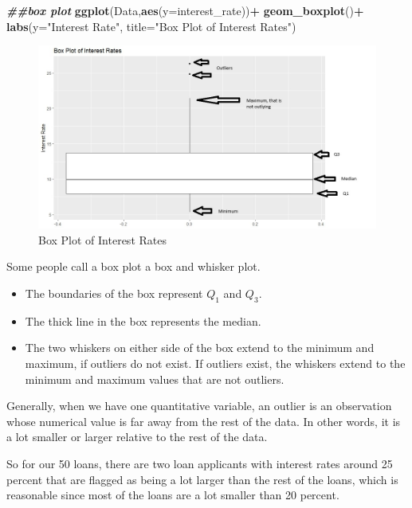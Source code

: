 \documentclass[
]{book}
\newenvironment{Shaded}{\begin{snugshade}}{\end{snugshade}}
\newcommand{\AttributeTok}[1]{\textcolor[rgb]{0.13,0.29,0.53}{#1}}
\newcommand{\DocumentationTok}[1]{\textcolor[rgb]{0.56,0.35,0.01}{\textbf{\textit{#1}}}}
\newcommand{\FunctionTok}[1]{\textcolor[rgb]{0.13,0.29,0.53}{\textbf{#1}}}
\newcommand{\NormalTok}[1]{#1}
\newcommand{\SpecialCharTok}[1]{\textcolor[rgb]{0.81,0.36,0.00}{\textbf{#1}}}
\newcommand{\StringTok}[1]{\textcolor[rgb]{0.31,0.60,0.02}{#1}}
\providecommand{\tightlist}{%
  \setlength{\itemsep}{0pt}\setlength{\parskip}{0pt}}
\begin{document}
\begin{Shaded}
\begin{Highlighting}[]
\DocumentationTok{\#\#box plot}
\FunctionTok{ggplot}\NormalTok{(Data,}\FunctionTok{aes}\NormalTok{(}\AttributeTok{y=}\NormalTok{interest\_rate))}\SpecialCharTok{+}
  \FunctionTok{geom\_boxplot}\NormalTok{()}\SpecialCharTok{+}
  \FunctionTok{labs}\NormalTok{(}\AttributeTok{y=}\StringTok{"Interest Rate"}\NormalTok{, }\AttributeTok{title=}\StringTok{"Box Plot of Interest Rates"}\NormalTok{)}
\end{Highlighting}
\end{Shaded}

\begin{figure}
\centering
\includegraphics{images/01-boxplot.jpeg}
\caption{\label{fig:boxplot}Box Plot of Interest Rates}
\end{figure}

Some people call a box plot a box and whisker plot.

\begin{itemize}
\tightlist
\item
  The boundaries of the box represent \(Q_1\) and \(Q_3\).
\item
  The thick line in the box represents the median.
\item
  The two whiskers on either side of the box extend to the minimum and maximum, if outliers do not exist. If outliers exist, the whiskers extend to the minimum and maximum values that are not outliers.
\end{itemize}

Generally, when we have one quantitative variable, an outlier is an observation whose numerical value is far away from the rest of the data. In other words, it is a lot smaller or larger relative to the rest of the data.

So for our 50 loans, there are two loan applicants with interest rates around 25 percent that are flagged as being a lot larger than the rest of the loans, which is reasonable since most of the loans are a lot smaller than 20 percent.
\end{document}
